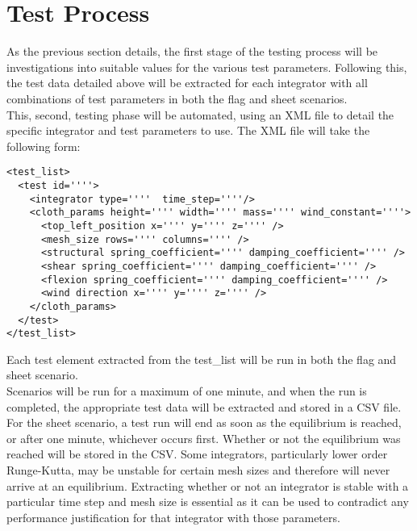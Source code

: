\section{Test Process}
As the previous section details, the first stage of the testing process will be investigations into suitable values for the various test parameters. Following this, the test data detailed above will be extracted for each integrator with all combinations of test parameters in both the flag and sheet scenarios.
\\This, second, testing phase will be automated, using an XML file to detail the specific integrator and test parameters to use. The XML file will take the following form:
\begin{lstlisting}
<test_list>
  <test id=''''>
    <integrator type=''''  time_step=''''/>
    <cloth_params height='''' width='''' mass='''' wind_constant=''''>
      <top_left_position x='''' y='''' z='''' />
      <mesh_size rows='''' columns='''' />
      <structural spring_coefficient='''' damping_coefficient='''' />
      <shear spring_coefficient='''' damping_coefficient='''' />
      <flexion spring_coefficient='''' damping_coefficient='''' />
      <wind direction x='''' y='''' z='''' />
    </cloth_params>
  </test>
</test_list>
\end{lstlisting}
Each test element extracted from the test\_list will be run in both the flag and sheet scenario.
\\Scenarios will be run for a maximum of one minute, and when the run is completed, the appropriate test data will be extracted and stored in a CSV file. 
\\For the sheet scenario, a test run will end as soon as the equilibrium is reached, or after one minute, whichever occurs first. Whether or not the equilibrium was reached will be stored in the CSV. Some integrators, particularly lower order Runge-Kutta, may be unstable for certain mesh sizes and therefore will never arrive at an equilibrium. Extracting whether or not an integrator is stable with a particular time step and mesh size is essential as it can be used to contradict any performance justification for that integrator with those parameters.